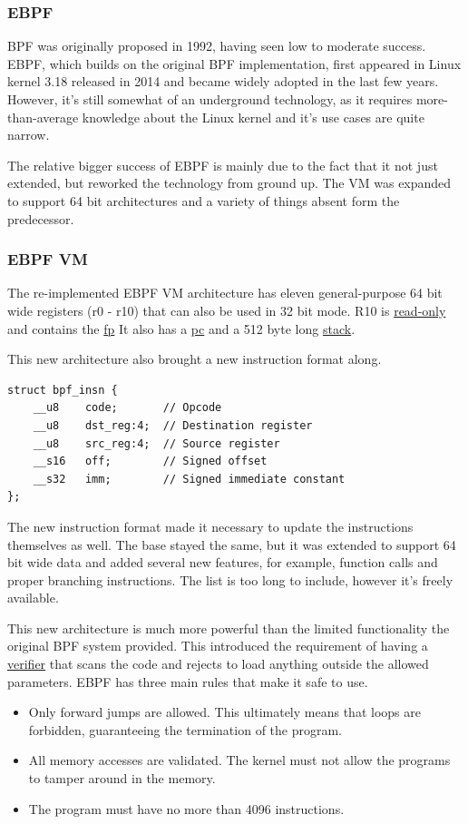 \newpage
\subsubsection{EBPF}
\label{sec:ebpfrules}
BPF was originally proposed in 1992, having seen low to moderate success. EBPF, which builds on the original BPF implementation, first appeared in Linux kernel 3.18\cite{kernel-318} released in 2014 and became widely adopted in the last few years. However, it's still somewhat of an underground technology, as it requires more-than-average knowledge about the Linux kernel and it's use cases are quite narrow.

The relative bigger success of EBPF is mainly due to the fact that it not just extended, but reworked the technology from ground up. The VM was expanded to support 64 bit architectures and a variety of things absent form the predecessor.

\subsubsection{EBPF VM}
The re-implemented EBPF VM architecture has eleven general-purpose 64 bit wide registers (r0 - r10) that can also be used in 32 bit mode. R10 is \underline{\gls{read-only}} and contains the \underline{\gls{fp}} It also has a \underline{\gls{pc}} and a 512 byte long \underline{\gls{stack}}.

This new architecture also brought a new instruction format along.
\begin{verbatim}
struct bpf_insn {
	__u8	code;		// Opcode 
	__u8	dst_reg:4;	// Destination register
	__u8	src_reg:4;	// Source register
	__s16	off;		// Signed offset
	__s32	imm;		// Signed immediate constant
};
\end{verbatim}

The new instruction format made it necessary to update the instructions themselves as well. The base stayed the same, but it was extended to support 64 bit wide data and added several new features, for example, function calls and proper branching instructions. The list is too long to include, however it's freely available\cite{ebpf-instructions}.

This new architecture is much more powerful than the limited functionality the original BPF system provided. This introduced the requirement of having a \underline{\gls{verifier}} that scans the code and rejects to load anything outside the allowed parameters. EBPF has three main rules that make it safe to use.
\begin{itemize}
	\item Only forward jumps are allowed. This ultimately means that loops are forbidden, guaranteeing the termination of the program.
	\item All memory accesses are validated. The kernel must not allow the programs to tamper around in the memory.
	\item The program must have no more than 4096 instructions.
\end{itemize}

